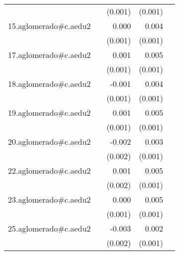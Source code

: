 {\begin{longtable}{l*{4}{D{.}{.}{-1}}}
            &                     &     (0.001)         &     (0.001)         &                     \\
\addlinespace
15.aglomerado#c.aedu2&                     &       0.000         &       0.004\sym{***}&                     \\
            &                     &     (0.001)         &     (0.001)         &                     \\
\addlinespace
17.aglomerado#c.aedu2&                     &       0.001         &       0.005\sym{***}&                     \\
            &                     &     (0.001)         &     (0.001)         &                     \\
\addlinespace
18.aglomerado#c.aedu2&                     &      -0.001         &       0.004\sym{***}&                     \\
            &                     &     (0.001)         &     (0.001)         &                     \\
\addlinespace
19.aglomerado#c.aedu2&                     &       0.001         &       0.005\sym{***}&                     \\
            &                     &     (0.001)         &     (0.001)         &                     \\
\addlinespace
20.aglomerado#c.aedu2&                     &      -0.002         &       0.003         &                     \\
            &                     &     (0.002)         &     (0.001)         &                     \\
\addlinespace
22.aglomerado#c.aedu2&                     &       0.001         &       0.005\sym{***}&                     \\
            &                     &     (0.002)         &     (0.001)         &                     \\
\addlinespace
23.aglomerado#c.aedu2&                     &       0.000         &       0.005\sym{***}&                     \\
            &                     &     (0.001)         &     (0.001)         &                     \\
\addlinespace
25.aglomerado#c.aedu2&                     &      -0.003         &       0.002         &                     \\
            &                     &     (0.002)         &     (0.001)         &                     \\

\end{longtable}}
